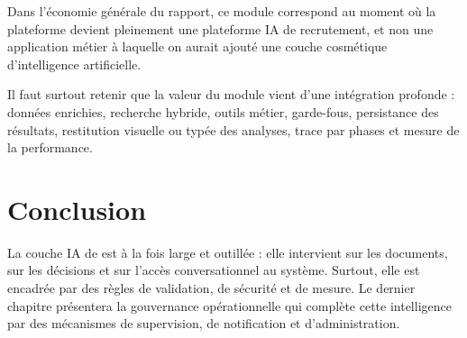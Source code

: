 Dans l'économie générale du rapport, ce module correspond au moment où la plateforme devient pleinement une plateforme IA de recrutement, et non une application métier à laquelle on aurait ajouté une couche cosmétique d'intelligence artificielle.

Il faut surtout retenir que la valeur du module vient d'une intégration profonde : données enrichies, recherche hybride, outils métier, garde-fous, persistance des résultats, restitution visuelle ou typée des analyses, trace par phases et mesure de la performance.

\section*{Conclusion}
La couche IA de \projectname{} est à la fois large et outillée : elle intervient sur les documents, sur les décisions et sur l'accès conversationnel au système. Surtout, elle est encadrée par des règles de validation, de sécurité et de mesure. Le dernier chapitre présentera la gouvernance opérationnelle qui complète cette intelligence par des mécanismes de supervision, de notification et d'administration.
